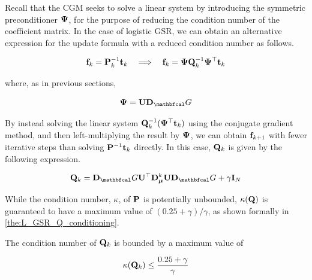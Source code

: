 Recall that the CGM seeks to solve a linear system by introducing the symmetric preconditioner $\mathbf{\Psi}$, for the purpose of reducing the condition number of the coefficient matrix. In the case of logistic GSR, we can obtain an alternative expression for the update formula with a reduced condition number as follows. 

\begin{equation*}
    \mathbf{f}_k = \mathbf{P}^{-1}_k \mathbf{t}_k \quad \Longrightarrow \quad \mathbf{f}_k = \mathbf{\Psi} \mathbf{Q}_k^{-1} \mathbf{\Psi}^\top \mathbf{t}_k
\end{equation*}

where, as in previous sections, 

\begin{equation*}
    \PSI = \U \D_\Gt
\end{equation*}

By instead solving the linear system $\mathbf{Q}_k^{-1} (\mathbf{\Psi}^\top \mathbf{t}_k)$ using the conjugate gradient method, and then left-multiplying the result by $\mathbf{\Psi}$, we can obtain $\mathbf{f}_{k+1}$ with fewer iterative steps than solving $\mathbf{P}^{-1} \mathbf{t}_k$ directly. In this case, $\mathbf{Q}_k$ is given by the following expression. 

\begin{equation}
    \label{eq:Q_LGSR}
    \Q_k = \D_\Gt \U^\top \D_{\muu}^k \U \D_\Gt + \gamma \I_N
\end{equation}

While the condition number, $\kappa$, of $\mathbf{P}$ is potentially unbounded, $\kappa(\mathbf{Q})$ is guaranteed to have a maximum value of $(0.25 + \gamma) / \gamma$, as shown formally in \cref{the:L_GSR_Q_conditioning}. 

\begin{theorem}
    \label{the:L_GSR_Q_conditioning}
    
    The condition number of $\mathbf{Q}_k$ is bounded by a maximum value of 
    
    \begin{equation}
        \kappa(\mathbf{Q}_k) \leq \frac{0.25 + \gamma}{\gamma}
    \end{equation}

\end{theorem}

